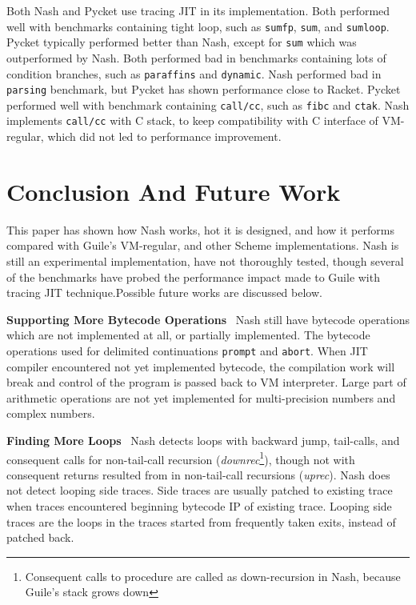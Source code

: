 \documentclass[preprint, numbers]{sigplanconf}
\begin{document}
Both Nash and Pycket use tracing JIT in its implementation. Both performed
well with benchmarks containing tight loop, such as \texttt{sumfp},
\texttt{sum}, and \texttt{sumloop}. Pycket typically performed better than
Nash, except for \texttt{sum} which was outperformed by Nash. Both performed
bad in benchmarks containing lots of condition branches, such as
\texttt{paraffins} and \texttt{dynamic}. Nash performed bad in
\texttt{parsing} benchmark, but Pycket has shown performance close to
Racket. Pycket performed well with benchmark containing \texttt{call/cc}, such
as \texttt{fibc} and \texttt{ctak}. Nash implements \texttt{call/cc} with C
stack, to keep compatibility with C interface of VM-regular, which did not led
to performance improvement.

\section{Conclusion And Future Work}
\label{sec:conclusion}
This paper has shown how Nash works, hot it is designed, and how it performs
compared with Guile's VM-regular, and other Scheme implementations. Nash is
still an experimental implementation, have not thoroughly tested, though
several of the benchmarks have probed the performance impact made to Guile
with tracing JIT technique.\@ Possible future works are discussed below.

\bigskip

\textbf{Supporting More Bytecode Operations} \@~\@ Nash still have bytecode
operations which are not implemented at all, or partially implemented. The
bytecode operations used for delimited continuations \texttt{prompt} and
\texttt{abort}. When JIT compiler encountered not yet implemented bytecode,
the compilation work will break and control of the program is passed back to
VM interpreter. Large part of arithmetic operations are not yet implemented
for multi-precision numbers and complex numbers.

\bigskip

\textbf{Finding More Loops} \@~\@ Nash detects loops with backward jump,
tail-calls, and consequent calls for non-tail-call recursion
(\textit{downrec}\footnote{Consequent calls to procedure are called as
  down-recursion in Nash, because Guile's stack grows down}), though not with
consequent returns resulted from in non-tail-call recursions
(\textit{uprec}). Nash does not detect looping side traces. Side traces are
usually patched to existing trace when traces encountered beginning bytecode
IP of existing trace. Looping side traces are the loops in the traces started
from frequently taken exits, instead of patched back.
\end{document}
